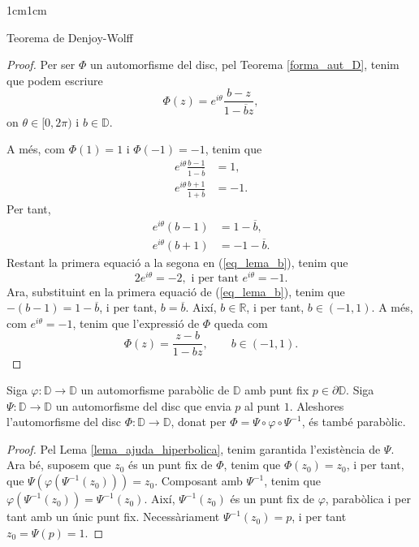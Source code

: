 \begin{adjustwidth}{1cm}{1cm}
\begin{subsection}{Teorema de Denjoy-Wolff}
    \begin{proof}
        Per ser $\Phi$ un automorfisme del disc, pel Teorema \ref{forma_aut_D}, tenim que podem escriure
        \[
            \Phi(z)=e^{i\theta}\frac{b-z}{1-\overline{b}z},
        \]
        on $\theta\in[0,2\pi)$ i $b\in \mathbb{D}$.

        A més, com $\Phi(1)=1$ i $\Phi(-1)=-1$, tenim que
        \begin{equation*}
            \begin{aligned}
                e^{i\theta}\frac{b-1}{1-\overline{b}} &=1,\\
                e^{i\theta}\frac{b+1}{1+\overline{b}} &=-1.
            \end{aligned}
        \end{equation*}
        Per tant, 
        \begin{equation}
            \begin{aligned}
                e^{i\theta}(b-1) &=1-\overline{b},\\
                e^{i\theta}(b+1) &=-1-\overline{b}.
            \end{aligned}
            \label{eq_lema_b}
        \end{equation}
        Restant la primera equació a la segona en (\ref{eq_lema_b}), tenim que
        \[
            2e^{i\theta}=-2, \text{ i per tant } e^{i\theta}=-1.
        \]
        Ara, substituint en la primera equació de (\ref{eq_lema_b}), tenim que $-(b-1)=1-\overline{b}$, i per tant, $b=\overline{b}$. Així, $b\in \mathbb{R}$, i per tant, $b\in(-1,1)$. A més, com $e^{i\theta}=-1$, tenim que l'expressió de $\Phi$ queda com 
        \[
            \Phi(z)=\frac{z-b}{1-bz}, \qquad b\in(-1,1).
        \] 
    \end{proof}

    \begin{lema}
        Siga $\varphi:\mathbb{D}\to \mathbb{D}$ un automorfisme parabòlic de $\mathbb{D}$ amb punt fix $p\in\partial \mathbb{D}$. Siga $\Psi:\mathbb{D}\to \mathbb{D}$ un automorfisme del disc que envia $p$ al punt $1$. Aleshores l'automorfisme del disc $\Phi:\mathbb{D}\to \mathbb{D}$, donat per $\Phi=\Psi\circ\varphi\circ\Psi^{-1}$, és també parabòlic.
        \label{phi_tb_parab}
    \end{lema}

    \begin{proof}
        Pel Lema \ref{lema_ajuda_hiperbolica}, tenim garantida l'existència de $\Psi$. Ara bé, suposem que $z_0$ és un punt fix de $\Phi$, tenim que $\Phi(z_0)=z_0$, i per tant, que $\Psi(\varphi(\Psi^{-1}(z_0)))=z_0$. Composant amb $\Psi^{-1}$, tenim que $\varphi(\Psi^{-1}(z_0))=\Psi^{-1}(z_0)$. Així, $\Psi^{-1}(z_0)$ és un punt fix de $\varphi$, parabòlica i per tant amb un únic punt fix. Necessàriament $\Psi^{-1}(z_0)=p$, i per tant $z_0=\Psi(p)=1$. 


\end{proof}
\end{subsection}
\end{adjustwidth}
